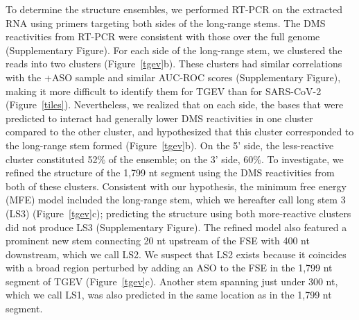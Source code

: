 \documentclass[main.tex]{subfiles}
\begin{document}
To determine the structure ensembles, we performed RT-PCR on the extracted RNA using primers targeting both sides of the long-range stems.
The DMS reactivities from RT-PCR were consistent with those over the full genome (Supplementary Figure).
For each side of the long-range stem, we clustered the reads into two clusters (Figure~\ref{tgev}b).
These clusters had similar correlations with the +ASO sample and similar AUC-ROC scores (Supplementary Figure), making it more difficult to identify them for TGEV than for SARS-CoV-2 (Figure~\ref{tiles}).
Nevertheless, we realized that on each side, the bases that were predicted to interact had generally lower DMS reactivities in one cluster compared to the other cluster, and hypothesized that this cluster corresponded to the long-range stem formed (Figure~\ref{tgev}b).
On the 5' side, the less-reactive cluster constituted 52\% of the ensemble; on the 3' side, 60\%.
To investigate, we refined the structure of the 1,799 nt segment using the DMS reactivities from both of these clusters.
Consistent with our hypothesis, the minimum free energy (MFE) model included the long-range stem, which we hereafter call long stem 3 (LS3) (Figure~\ref{tgev}c); predicting the structure using both more-reactive clusters did not produce LS3 (Supplementary Figure).
The refined model also featured a prominent new stem connecting 20 nt upstream of the FSE with 400 nt downstream, which we call LS2.
We suspect that LS2 exists because it coincides with a broad region perturbed by adding an ASO to the FSE in the 1,799 nt segment of TGEV (Figure~\ref{tgev}c).
Another stem spanning just under 300 nt, which we call LS1, was also predicted in the same location as in the 1,799 nt segment.
\end{document}
